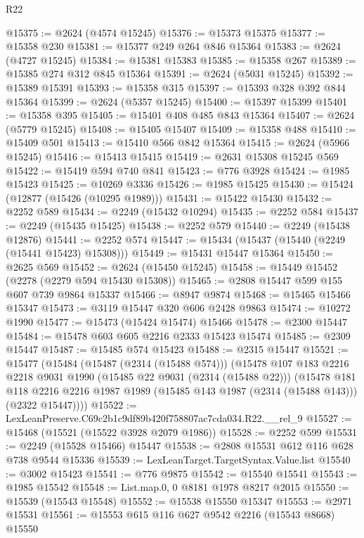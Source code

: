 \begin{lexlean}{R22}
\begin{coremodule}
@15375 := @2624 (@4574 @15245)
@15376 := @15373 @15375
@15377 := @15358 @230
@15381 := @15377 @249 @264 @846 @15364
@15383 := @2624 (@4727 @15245)
@15384 := @15381 @15383
@15385 := @15358 @267
@15389 := @15385 @274 @312 @845 @15364
@15391 := @2624 (@5031 @15245)
@15392 := @15389 @15391
@15393 := @15358 @315
@15397 := @15393 @328 @392 @844 @15364
@15399 := @2624 (@5357 @15245)
@15400 := @15397 @15399
@15401 := @15358 @395
@15405 := @15401 @408 @485 @843 @15364
@15407 := @2624 (@5779 @15245)
@15408 := @15405 @15407
@15409 := @15358 @488
@15410 := @15409 @501
@15413 := @15410 @566 @842 @15364
@15415 := @2624 (@5966 @15245)
@15416 := @15413 @15415
@15419 := @2631 @15308 @15245 @569
@15422 := @15419 @594 @740 @841
@15423 := @776 @3928
@15424 := @1985 @15423
@15425 := @10269 @3336
@15426 := @1985 @15425
@15430 := @15424 (@12877 (@15426 (@10295 @1989)))
@15431 := @15422 @15430
@15432 := @2252 @589
@15434 := @2249 (@15432 @10294)
@15435 := @2252 @584
@15437 := @2249 (@15435 @15425)
@15438 := @2252 @579
@15440 := @2249 (@15438 @12876)
@15441 := @2252 @574
@15447 := @15434 (@15437 (@15440 (@2249 (@15441 @15423) @15308)))
@15449 := @15431 @15447 @15364
@15450 := @2625 @569
@15452 := @2624 (@15450 @15245)
@15458 := @15449 @15452 (@2278 (@2279 @594 @15430 @15308))
@15465 := @2808 @15447 @599 @155 @607 @739 @9864 @15337
@15466 := @8947 @9874
@15468 := @15465 @15466 @15347
@15473 := @3119 @15447 @320 @606 @2428 @9863
@15474 := @10272 @1990
@15477 := @15473 (@15424 @15474) @15466
@15478 := @2300 @15447
@15484 := @15478 @603 @605 @2216 @2333 @15423 @15474
@15485 := @2309 @15447
@15487 := @15485 @574 @15423
@15488 := @2315 @15447
@15521 := @15477
    (@15484
      (@15487 (@2314 (@15488 @574)))
      (@15478
        @107
        @183
        @2216
        @2218
        @9031
        @1990
        (@15485 @22 @9031 (@2314 (@15488 @22)))
        (@15478
          @181
          @118
          @2216
          @2216
          @1987
          @1989
          (@15485 @143 @1987 (@2314 (@15488 @143)))
          (@2322 @15447))))
@15522 := LexLeanPreserve.C69c2b1c9df89b420f758807ac7cda034.R22.__rel_9
@15527 := @15468 (@15521 (@15522 @3928 @2079 @1986))
@15528 := @2252 @599
@15531 := @2249 (@15528 @15466) @15447
@15538 := @2808 @15531 @612 @116 @628 @738 @9544 @15336
@15539 := LexLeanTarget.TargetSyntax.Value.list
@15540 := @3002 @15423
@15541 := @776 @9875
@15542 := @15540 @15541
@15543 := @1985 @15542
@15548 := List.map.{0, 0} @8181 @1978 @8217 @2015
@15550 := @15539 (@15543 @15548)
@15552 := @15538 @15550 @15347
@15553 := @2971 @15531
@15561 := @15553 @615 @116 @627 @9542 @2216 (@15543 @8668) @15550

\end{coremodule}
\end{lexlean}
